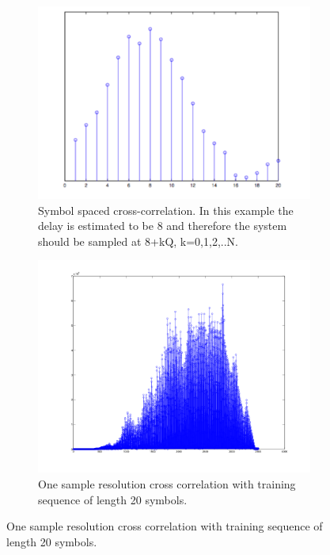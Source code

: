 \documentclass[12pt,a4paper,openright]{report}
\begin{document}
\begin{figure}[H] 
  \begin{subfigure}[b]{0.5\linewidth}
    \centering
    \includegraphics[width=1\linewidth]{ss.pdf} 
    \caption{Symbol spaced cross-correlation. In this example the delay is estimated to be 8 and therefore the system should be sampled at 8+kQ, k=0,1,2,..N.} 
    \label{fig:a} 
    \vspace{4ex}
  \end{subfigure}%
  \quad
  \begin{subfigure}[b]{0.5\linewidth}
    \centering
    \includegraphics[width=1\linewidth]{20.png} 
    \caption{One sample resolution cross correlation with training sequence of length 20 symbols.  \\} 

\end{subfigure}
\end{figure}
\end{document}
